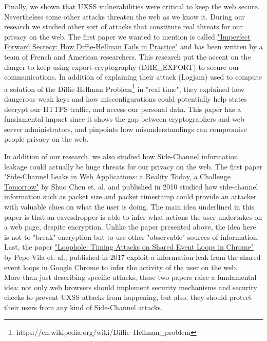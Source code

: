 \documentclass[journal]{IEEEtran}
\begin{document}
Finally, we shown that UXSS vulnerabilities were critical to keep the web secure. Nevertheless some other attacks threaten the web as we know it. During our research we studied other sort of attacks that constitute real threats for our privacy on the web. The first paper we wanted to mention is called \ul{"Imperfect Forward Secrecy: How Diffie-Hellman Fails in Practice"} and has been written by a team of French and American researchers. This research put the accent on the danger to keep using export-cryptography (DHE\_EXPORT) to secure our communications. In addition of explaining their attack (Logjam) used to compute a solution of the Diffie-Hellman Problem\footnote{https://en.wikipedia.org/wiki/Diffie–Hellman\_problem} in "real time", they explained how dangerous weak keys and how misconfigurations could potentially help states decrypt our HTTPS traffic, and access our personal data. This paper has a fundamental impact since it shows the gap between cryptographers and web server administrators, and pinpoints how misunderstandings can compromise people privacy on the web. 

\medskip

In addition of our research, we also studied how Side-Channel information leakage could actually be huge threats for our privacy on the web. The first paper \ul{"Side-Channel Leaks in Web Applications: a Reality Today, a Challenge Tomorrow"} by Shuo Chen et. al. and published in 2010 studied how side-channel information such as packet size and packet timestamp could provide an attacker with valuable clues on what the user is doing. The main idea underlined in this paper is that an eavesdropper is able to infer what actions the user undertakes on a web page, despite encryption. Unlike the paper presented above, the idea here is not to "break" encryption but to use other "observable" sources of information. \\
Last, the paper \ul{"Loophole: Timing Attacks on Shared Event Loops in Chrome"} by Pepe Vila et. al., published in 2017 exploit a information leak from the shared event loops in Google Chrome to infer the activity of the user on the web. \\
More than just describing specific attacks, these two papers raise a fundamental idea: not only web browsers should implement security mechanisms and security checks to prevent UXSS attacks from happening, but also, they should protect their users from any kind of Side-Channel attacks.

\medskip
\end{document}
